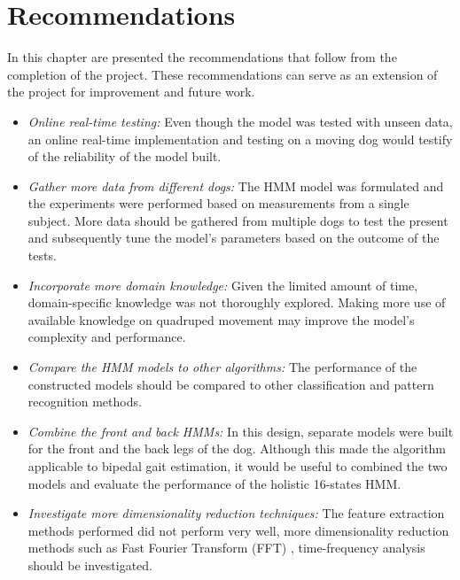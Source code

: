 \chapter{Recommendations}
In this chapter are presented the recommendations that follow from the completion of the project. These recommendations can serve as an extension of the project for improvement and future work.
\begin{itemize}
	\item \textit{Online real-time testing:} Even though the model was tested with unseen data, an online real-time implementation and testing on a moving dog would testify of the reliability of the model built.
	
	\item \textit{Gather more data from different dogs:} The HMM model was formulated and the experiments were performed based on measurements from a single subject. More data should be gathered from multiple dogs to test the present and subsequently tune the model's parameters based on the outcome of the tests.
	
	\item \textit{Incorporate more domain knowledge:} Given the limited amount of time, domain-specific knowledge was not thoroughly explored. Making more use of available knowledge on quadruped movement may improve the model's complexity and performance. 
	
	\item \textit{Compare the HMM models to other algorithms:} The performance of the constructed models should be compared to other classification and pattern recognition methods.
	
	\item \textit{Combine the front and back HMMs:} In this design, separate models were built for the front and the back legs of the dog. Although this made the algorithm applicable to bipedal gait estimation, it would be useful to combined the two models and evaluate the performance of the holistic 16-states HMM.
	
	\item \textit{Investigate more dimensionality reduction techniques:} The feature extraction methods performed did not perform very well, more dimensionality reduction methods such as Fast Fourier Transform (FFT) \cite{towa2009}, time-frequency analysis \cite{ches2012} should be investigated.
\end{itemize}
